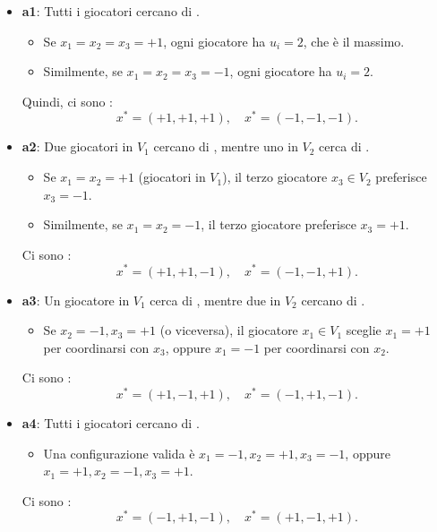 \documentclass[a4paper,12pt]{article}
\begin{document}
	\begin{itemize}
		\item \textbf{a1}: 
		Tutti i giocatori cercano di .
		\begin{itemize}
			\item Se $x_1 = x_2 = x_3 = +1$, ogni giocatore ha $u_i = 2$, che è il massimo.
			\item Similmente, se $x_1 = x_2 = x_3 = -1$, ogni giocatore ha $u_i = 2$.
		\end{itemize}
		
		Quindi, ci sono :
		$$
		x^* = (+1, +1, +1), \quad x^* = (-1, -1, -1).
		$$
		\item \textbf{a2}:
		Due giocatori in $V_1$ cercano di , mentre uno in $V_2$ cerca di .
		\begin{itemize}
			\item Se $x_1 = x_2 = +1$ (giocatori in $V_1$), il terzo giocatore $x_3 \in V_2$ preferisce $x_3 = -1$.
			\item Similmente, se $x_1 = x_2 = -1$, il terzo giocatore preferisce $x_3 = +1$.
		\end{itemize}
		
		Ci sono :
		$$
		x^* = (+1, +1, -1), \quad x^* = (-1, -1, +1).
		$$
		
		\item \textbf{a3}:
		Un giocatore in $V_1$ cerca di , mentre due in $V_2$ cercano di .
		\begin{itemize}
			\item Se $x_2 = -1, x_3 = +1$ (o viceversa), il giocatore $x_1 \in V_1$ sceglie $x_1 = +1$ per coordinarsi con $x_3$, oppure $x_1 = -1$ per coordinarsi con $x_2$.
		\end{itemize}
		
		Ci sono :
		$$
		x^* = (+1, -1, +1), \quad x^* = (-1, +1, -1).
		$$
		
		\item \textbf{a4}:
		Tutti i giocatori cercano di .
		\begin{itemize}
			\item Una configurazione valida è $x_1 = -1, x_2 = +1, x_3 = -1$, oppure $x_1 = +1, x_2 = -1, x_3 = +1$.
		\end{itemize}
		
		Ci sono :
		$$
		x^* = (-1, +1, -1), \quad x^* = (+1, -1, +1).
		$$
	\end{itemize}
\end{document}
